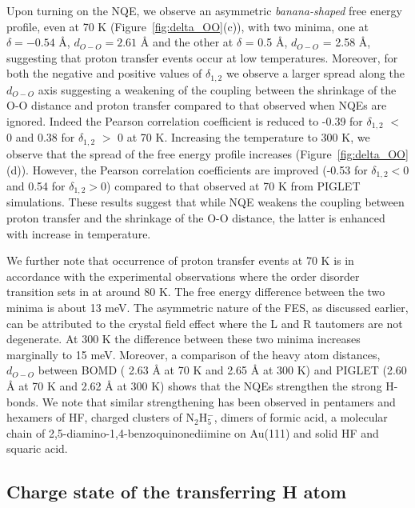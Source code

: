 Upon turning on the NQE, we observe an asymmetric \emph{banana-shaped} free energy profile, even at 70 K (Figure~\ref{fig:delta_OO}(c)), with two minima, one at $\delta=-0.54$ \AA{}, $d_{O-O}=2.61$ \AA{} and the other at 
$\delta$ = 0.5 \AA{}, $d_{O-O}$ = 2.58 \AA{}, suggesting that proton transfer events occur at low temperatures.
Moreover, for both the negative and positive values of $\delta_{1,2}$ we observe a larger
spread along the $d_{O-O}$ axis suggesting a weakening of the coupling between the shrinkage of
the O-O distance and proton transfer compared to that observed when NQEs are ignored.
Indeed the Pearson correlation coefficient is reduced to -0.39 for $\delta_{1,2}$ $<$ 0 and 0.38 for $\delta_{1,2}$ $>$ 0 at 70 K. Increasing the temperature to 300 K, we observe that the spread of the free energy profile increases (Figure~\ref{fig:delta_OO}(d)). However, the Pearson correlation coefficients are improved (-0.53 for $\delta_{1,2} < 0$ and 0.54 for $\delta_{1,2} > 0$) compared to that observed at 70 K from PIGLET simulations. These results suggest that while NQE weakens the coupling between proton transfer and the shrinkage of the O-O distance, the latter is enhanced with increase in temperature.

We further note that occurrence of proton transfer events at 70 K is in accordance with the experimental observations where the order disorder transition sets in at around 80 K.\cite{fjaer1986order, fischer1986structure} The free energy
difference between the two minima is about 13 meV. The asymmetric nature of the FES, as discussed earlier, can be attributed to the crystal field effect where the L and R tautomers are not degenerate. At 300 K the difference between these two minima increases marginally to 15 meV. Moreover, a comparison of the heavy atom distances, $d_{O-O}$ between BOMD ( 2.63 \AA {} at 70 K and 2.65 \AA{} at 300 K) and PIGLET (2.60 \AA{} at 70 K and 2.62 \AA{} at 300 K) shows that the NQEs strengthen the strong H-bonds. We note that similar strengthening has been observed in pentamers and hexamers of HF\cite{li2011quantum}, charged clusters of N$_2$H$_5^{-}$\cite{li2011quantum}, dimers of formic acid\cite{li2011quantum}, a molecular chain of 2,5-diamino-1,4-benzoquinonediimine\cite{cahlik2021significance} on Au(111) and solid HF and squaric acid\cite{wikfeldt2014communication,li2011quantum}.


\subsection{Charge state of the transferring H atom} 

